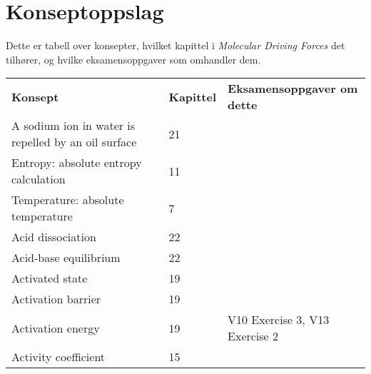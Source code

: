 \section{Konseptoppslag}
\noindent Dette er tabell over konsepter, hvilket kapittel i \emph{Molecular Driving Forces} det tilhører, og hvilke eksamensoppgaver som omhandler dem.
{\small
{}
\begin{longtabu} to \textwidth {X[0.7 , p ]  X[0.4 , p ]X[1 , p ]}
\textbf{Konsept}                                                           & \textbf{Kapittel}             & \textbf{Eksamensoppgaver om dette}                                                                                     \\
A sodium ion in water is repelled by an oil surface               & 21                  &                                                                                                \\
Entropy: absolute entropy calculation                             & 11                  &                                                                                                \\
Temperature: absolute temperature                                 & 7                   &                                                                                                \\
Acid dissociation                                                 & 22                  &                                                                                                \\
Acid-base equilibrium                                             & 22                  &                                                                                                \\
Activated state                                                   & 19                  &                                                                                                \\
Activation barrier                                                & 19                  &                                                                                                \\
Activation energy                                                 & 19                  & V10 Exercise 3, V13 Exercise 2                                                                 \\
Activity coefficient                                              & 15                  &                                                                                                \\

\end{longtabu}}

